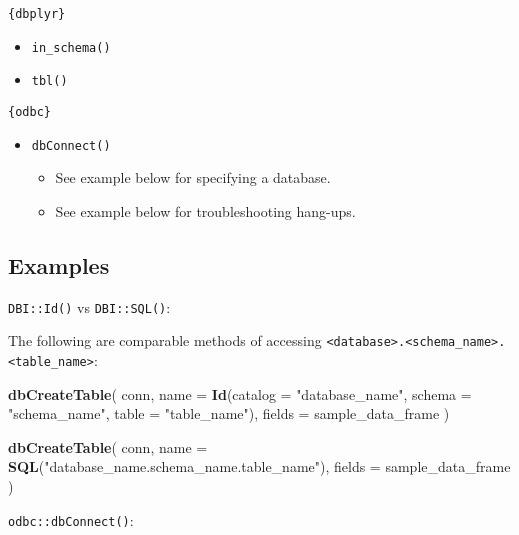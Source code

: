 \documentclass[
]{book}
\newenvironment{Shaded}{\begin{snugshade}}{\end{snugshade}}
\newcommand{\DataTypeTok}[1]{\textcolor[rgb]{0.13,0.29,0.53}{#1}}
\newcommand{\KeywordTok}[1]{\textcolor[rgb]{0.13,0.29,0.53}{\textbf{#1}}}
\newcommand{\NormalTok}[1]{#1}
\newcommand{\StringTok}[1]{\textcolor[rgb]{0.31,0.60,0.02}{#1}}
\providecommand{\tightlist}{%
  \setlength{\itemsep}{0pt}\setlength{\parskip}{0pt}}
\begin{document}
\texttt{\{dbplyr\}}

\begin{itemize}
\tightlist
\item
  \texttt{in\_schema()}
\item
  \texttt{tbl()}
\end{itemize}

\texttt{\{odbc\}}

\begin{itemize}
\tightlist
\item
  \texttt{dbConnect()}

  \begin{itemize}
  \tightlist
  \item
    See example below for specifying a database.
  \item
    See example below for troubleshooting hang-ups.
  \end{itemize}
\end{itemize}

\hypertarget{examples-1}{%
\subsection{Examples}\label{examples-1}}

\texttt{DBI::Id()} vs \texttt{DBI::SQL()}:

The following are comparable methods of accessing \texttt{\textless{}database\textgreater{}.\textless{}schema\_name\textgreater{}.\textless{}table\_name\textgreater{}}:

\begin{Shaded}
\begin{Highlighting}[]
\KeywordTok{dbCreateTable}\NormalTok{(}
\NormalTok{  conn,}
  \DataTypeTok{name =} 
    \KeywordTok{Id}\NormalTok{(}\DataTypeTok{catalog =} \StringTok{"database_name"}\NormalTok{, }\DataTypeTok{schema =} \StringTok{"schema_name"}\NormalTok{, }\DataTypeTok{table =} \StringTok{"table_name"}\NormalTok{),}
  \DataTypeTok{fields =}\NormalTok{ sample_data_frame}
\NormalTok{)}

\KeywordTok{dbCreateTable}\NormalTok{(}
\NormalTok{  conn,}
  \DataTypeTok{name =} \KeywordTok{SQL}\NormalTok{(}\StringTok{"database_name.schema_name.table_name"}\NormalTok{),}
  \DataTypeTok{fields =}\NormalTok{ sample_data_frame}
\NormalTok{)}
\end{Highlighting}
\end{Shaded}

\texttt{odbc::dbConnect()}:
\end{document}
